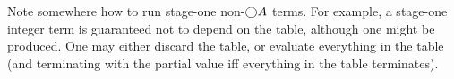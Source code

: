 %
%
%
%
%
%
%

\TODO
Note somewhere how to run stage-one non-$\bigcirc A$ terms. For example, a stage-one
integer term is guaranteed not to depend on the table, although one might be
produced. One may either discard the table, or evaluate everything in the table
(and terminating with the partial value iff everything in the table terminates).


